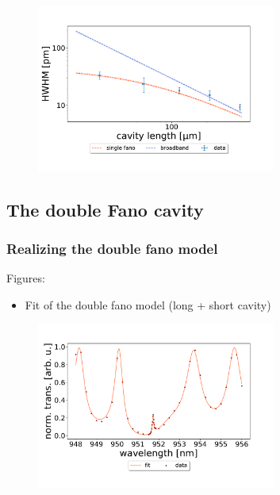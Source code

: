 \begin{figure}[h!]
    \centering
    \includegraphics[width=0.7\textwidth]{figures/results/HWHM_vs_cavity_length_single_fano.pdf}
    \caption{}
    \label{fig:HWHM_vs_time_single_fano_data}
\end{figure}

\subsection{The double Fano cavity}

\subsubsection{Realizing the double fano model}

Figures: 
\begin{itemize}
    \item Fit of the double fano model (long + short cavity)
\end{itemize}

\begin{figure}[h!]
    \centering
    \includegraphics[width=0.7\textwidth]{figures/results/238um_long_scan_fit.pdf}
    \caption{}
    \label{fig:238um_long_scan_fit}
\end{figure}

